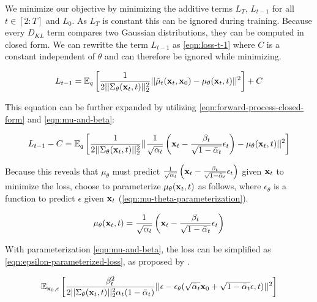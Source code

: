 We minimize our objective by minimizing the additive terms $L_T$, $L_{t-1}$ for all $t \in [2:T]$ and $L_0$.
As $L_T$ is constant this can be ignored during training.
Because every $D_{KL}$ term compares two Gaussian distributions, they can be computed in closed form.
We can rewritte the term $L_{t-1}$ as \autoref{eqn:loss-t-1} where $C$ is a constant independent of $\theta$ and can therefore be ignored while minimizing.

\begin{equation}
   \label{eqn:loss-t-1}
   L_{t-1}=\mathbb{E}_q\left[\frac{1}{2||\Sigma_\theta(\mathbf{x}_t,t)||_2^2}||\tilde{\mu}_t(\mathbf{x}_t,\mathbf{x}_0) - \mu_\theta(\mathbf{x}_t,t)||^2\right] + C
\end{equation}

This equation can be further expanded by utilizing \autoref{eqn:forward-process-closed-form} and \autoref{eqn:mu-and-beta}:

\begin{equation}
   L_{t-1} - C =\mathbb{E}_q\left[\frac{1}{2||\Sigma_\theta(\mathbf{x}_t,t)||_2^2}|| \frac{1}{\sqrt{\alpha_t}} \left(\mathbf{x}_t - \frac{\beta_t}{\sqrt{1 - \bar{\alpha}_t}} \epsilon_t \right) - \mu_\theta(\mathbf{x}_t,t)||^2\right]
\end{equation}

Because this reveals that $\mu_\theta$ must predict $\frac{1}{\sqrt{\alpha_t}} \left(\mathbf{x}_t - \frac{\beta_t}{\sqrt{1 - \bar{\alpha}_t}} \epsilon_t \right)$ given $\mathbf{x}_t$ to minimize the loss,
\textcite{ddpm} choose to parameterize $\mu_\theta(\mathbf{x}_t, t)$ as follows, where $\epsilon_\theta$ is a function to predict $\epsilon$ given $\mathbf{x}_t$ (\autoref{eqn:mu-theta-parameterization}).

\begin{equation}
   \label{eqn:mu-theta-parameterization}
   \mu_\theta(\mathbf{x}_t, t) = \frac{1}{\sqrt{\alpha_t}} \left(\mathbf{x}_t - \frac{\beta_t}{\sqrt{1 - \bar{\alpha}_t}} \epsilon_t \right)
\end{equation}

With parameterization \autoref{eqn:mu-and-beta}, the loss can be simplified as \autoref{eqn:epsilon-parameterized-loss}, as proposed by \textcite{ddpm}.

\begin{equation}
   \label{eqn:epsilon-parameterized-loss}
   \mathbb{E}_{\mathbf{x}_0, \epsilon}\left[ \frac{\beta_t^2}{2 ||\Sigma_\theta(\mathbf{x}_t,t)||_2^2 \alpha_t(1-\bar{\alpha}_t)} || \epsilon - \epsilon_\theta(\sqrt{\bar{\alpha}_t}\mathbf{x}_0 + \sqrt{1 - \bar{\alpha}_t} \epsilon,t) ||^2 \right]
\end{equation}


